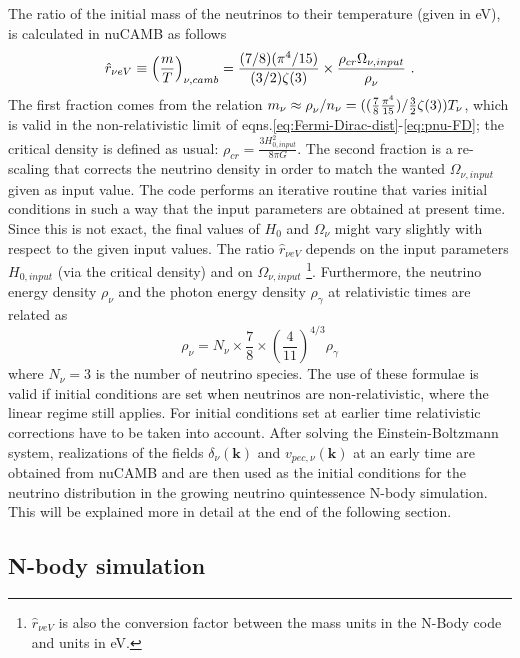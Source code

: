 The ratio of the initial mass of the neutrinos to their temperature
(given in eV), is calculated in nuCAMB as follows 
\begin{equation}
\hat{r}_{\nu eV}\equiv\left(\frac{m}{T}\right)_{\nu,camb}=\frac{(7/8)(\pi^{4}/15)}{(3/2)\zeta(3)}\times\frac{\rho_{cr}\Omega_{\nu,input}}{\text{\ensuremath{\rho}}_{\nu}}\,\,.
\end{equation}
The first fraction comes from the relation $m_{\nu}\approx\text{\ensuremath{\rho}}_{\nu}/n_{\nu}=((\frac{7}{8}\frac{\pi^{4}}{15})/\frac{3}{2}\zeta(3))T_{\nu}$,
which is valid in the non-relativistic limit of eqns.\ref{eq:Fermi-Dirac-dist}-\ref{eq:pnu-FD};
the critical density is defined as usual: $\rho_{cr}=\frac{3H_{0,input}^{2}}{8\pi G}$.
The second fraction is a re-scaling that corrects the neutrino density
in order to match the wanted $\Omega_{\nu,input}$ given as input
value. The code performs an iterative routine that varies initial
conditions in such a way that the input parameters are obtained at
present time. Since this is not exact, the final values of $H_{0}$
and $\Omega_{\nu}$ might vary slightly with respect to the given
input values. The ratio $\hat{r}_{\nu eV}$ depends on the input parameters
$H_{0,input}$ (via the critical density) and on $\Omega_{\nu,input}$
\footnote{$\hat{r}_{\nu eV}$ is also the conversion factor between the mass
units in the N-Body code and units in eV.%
}. Furthermore, the neutrino energy density $\rho_{\nu}$ and the photon
energy density $\rho_{\gamma}$ at relativistic times are related
as 
\begin{equation}
\rho_{\nu}=N_{\nu}\times\frac{7}{8}\times\left(\frac{4}{11}\right)^{4/3}\rho_{\gamma}
\end{equation}
where $N_{\nu}=3$ is the number of neutrino species. The use of these
formulae is valid if initial conditions are set when neutrinos are
non-relativistic, where the linear regime still applies. For initial
conditions set at earlier time relativistic corrections have to be
taken into account. After solving the Einstein-Boltzmann system, realizations
of the fields $\delta_{\nu}(\mathbf{k})$ and $v_{pec,\nu}(\mathbf{k})$
at an early time are obtained from nuCAMB and are then used as the
initial conditions for the neutrino distribution in the growing neutrino
quintessence N-body simulation. This will be explained more in detail
at the end of the following section.


\subsection{N-body simulation\label{sub:N-body-simulation}}

